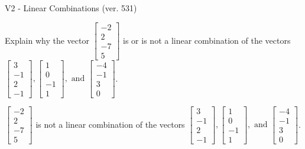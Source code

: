 \begin{exercise}
  \begin{exerciseTitle}V2 - Linear Combinations (ver. 531)\end{exerciseTitle}
  \begin{exerciseStatement}
    Explain why the vector \(\left[\begin{array}{c}
-2 \\
2 \\
-7 \\
5
\end{array}\right]\)  is or is not a linear 
	combination of the vectors \(\left[\begin{array}{c}
3 \\
-1 \\
2 \\
-1
\end{array}\right] , \left[\begin{array}{c}
1 \\
0 \\
-1 \\
1
\end{array}\right] , \text{ and } \left[\begin{array}{c}
-4 \\
-1 \\
3 \\
0
\end{array}\right]\).
	


  \end{exerciseStatement}
  \begin{exerciseAnswer}
   \(\left[\begin{array}{c}
-2 \\
2 \\
-7 \\
5
\end{array}\right]\) 
  	 is not  
	a linear combination of the vectors \(\left[\begin{array}{c}
3 \\
-1 \\
2 \\
-1
\end{array}\right] , \left[\begin{array}{c}
1 \\
0 \\
-1 \\
1
\end{array}\right] , \text{ and } \left[\begin{array}{c}
-4 \\
-1 \\
3 \\
0
\end{array}\right]\).

	
  


  \end{exerciseAnswer}
\end{exercise}